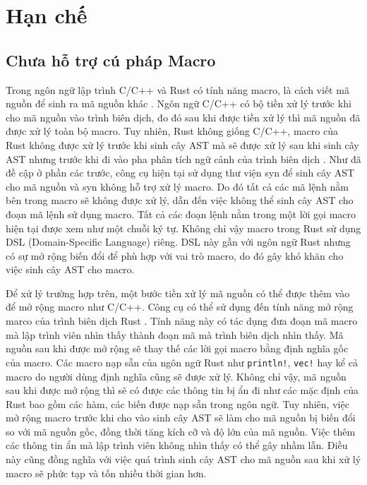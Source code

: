 \section{Hạn chế}
\label{sec:limit}

\subsection{Chưa hỗ trợ cú pháp Macro}

Trong ngôn ngữ lập trình C/C++ và Rust có tính năng macro, là cách viết mã nguồn để sinh ra mã nguồn khác \cite{rustlangMacrosRust}.
Ngôn ngữ C/C++ có bộ tiền xử lý trước khi cho mã nguồn vào trình biên dịch, đo đó sau khi được tiền xử lý thì mã nguồn đã được xử lý toàn bộ macro.
Tuy nhiên, Rust không giống C/C++, macro của Rust không được xử lý trước khi sinh cây AST mà sẽ được xử lý sau khi sinh cây AST nhưng trước khi đi vào pha phân tích ngữ cảnh của trình biên dịch \cite{veykrilSourceAnalysis}.
Như đã đề cập ở phần các trước, công cụ hiện tại sử dụng thư viện syn để sinh cây AST cho mã nguồn và syn không hỗ trợ xử lý macro.
Do đó tất cả các mã lệnh nằm bên trong macro sẽ không được xử lý, dẫn đến việc không thể sinh cây AST cho đoạn mã lệnh sử dụng macro.
Tất cả các đoạn lệnh nằm trong một lời gọi macro hiện tại được xem như một chuỗi ký tự.
Không chỉ vậy macro trong Rust sử dụng DSL (Domain-Specific Language) riêng.
DSL này gần với ngôn ngữ Rust nhưng có sự mở rộng biến đổi để phù hợp với vai trò macro, do đó gây khó khăn cho việc sinh cây AST cho macro.

Để xử lý trường hợp trên, một bước tiền xử lý mã nguồn có thể được thêm vào để mở rộng macro như C/C++.
Công cụ có thể sử dụng đến tính năng mở rộng marco của trình biên dịch Rust \cite{rustlangMacroExpansion}.
Tính năng này có tác dụng đưa đoạn mã macro mà lập trình viên nhìn thấy thành đoạn mã mà trình biên dịch nhìn thấy.
Mã nguồn sau khi được mở rộng sẽ thay thế các lời gọi macro bằng định nghĩa gốc của macro.
Các macro nạp sẵn của ngôn ngữ Rust như \texttt{println!}, \texttt{vec!} hay kể cả macro do người dùng định nghĩa cũng sẽ được xử lý.
Không chỉ vậy, mã nguồn sau khi được mở rộng thì sẽ có được các thông tin bị ẩn đi như các mặc định của Rust bao gồm các hàm, các biến được nạp sẵn trong ngôn ngữ.
Tuy nhiên, việc mở rộng macro trước khi cho vào sinh cây AST sẽ làm cho mã nguồn bị biến đổi so với mã nguồn gốc, đồng thời tăng kích cỡ và độ lớn của mã nguồn.
Việc thêm các thông tin ẩn mà lập trình viên không nhìn thấy có thể gây nhầm lẫn.
Điều này cũng đồng nghĩa với việc quá trình sinh cây AST cho mã nguồn sau khi xử lý macro sẽ phức tạp và tốn nhiều thời gian hơn.

